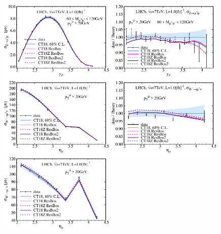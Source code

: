 \begin{figure}[htb]
	\includegraphics[width=0.49\textwidth]{./fig/sec6/data_245_CT18__1_ect.pdf}
	\includegraphics[width=0.49\textwidth]{./fig/sec6/data_245_CT18__1-TcD_ect.pdf}
	\includegraphics[width=0.49\textwidth]{./fig/sec6/data_245_CT18__2_ect.pdf}
	\includegraphics[width=0.49\textwidth]{./fig/sec6/data_245_CT18__2-TcD_ect.pdf}
	\includegraphics[width=0.49\textwidth]{./fig/sec6/data_245_CT18__3_ect.pdf}

\end{figure}
